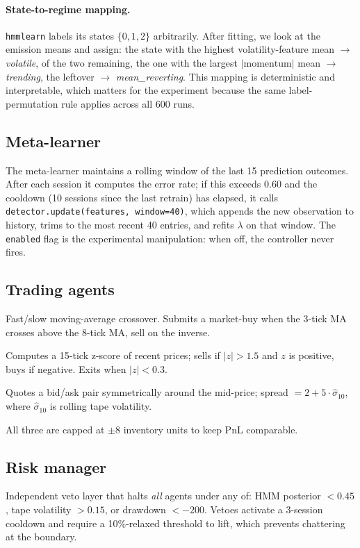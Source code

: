 \documentclass[11pt,a4paper]{article}
\begin{document}
\paragraph{State-to-regime mapping.}
\texttt{hmmlearn} labels its states $\{0,1,2\}$ arbitrarily. After fitting,
we look at the emission means and assign:
the state with the highest volatility-feature mean $\to$ \emph{volatile},
of the two remaining, the one with the largest $|\text{momentum}|$ mean $\to$
\emph{trending}, the leftover $\to$ \emph{mean\_reverting}. This mapping is
deterministic and interpretable, which matters for the experiment because
the same label-permutation rule applies across all 600 runs.

\subsection{Meta-learner}
The meta-learner maintains a rolling window of the last 15 prediction
outcomes. After each session it computes the error rate; if this exceeds
$0.60$ and the cooldown (10 sessions since the last retrain) has elapsed,
it calls \texttt{detector.update(features, window=40)}, which appends the new
observation to history, trims to the most recent 40 entries, and refits
$\lambda$ on that window. The \texttt{enabled} flag is the experimental
manipulation: when off, the controller never fires.

\subsection{Trading agents}
\begin{description}[leftmargin=0.6cm,style=nextline,itemsep=0.2ex]
    \item[Momentum agent.] Fast/slow moving-average crossover. Submits a
    market-buy when the 3-tick MA crosses above the 8-tick MA, sell on the
    inverse.
    \item[Contrarian agent.] Computes a 15-tick z-score of recent prices;
    sells if $|z| > 1.5$ and $z$ is positive, buys if negative. Exits when
    $|z| < 0.3$.
    \item[Market-maker.] Quotes a bid/ask pair symmetrically around the
    mid-price; spread $= 2 + 5 \cdot \widehat{\sigma}_{10}$, where
    $\widehat{\sigma}_{10}$ is rolling tape volatility.
\end{description}
All three are capped at $\pm$8 inventory units to keep PnL comparable.

\subsection{Risk manager}
Independent veto layer that halts \emph{all} agents under any of:
HMM posterior $< 0.45$, tape volatility $> 0.15$, or drawdown
$< -200$. Vetoes activate a 3-session cooldown and require a 10\%-relaxed
threshold to lift, which prevents chattering at the boundary.
\end{document}
